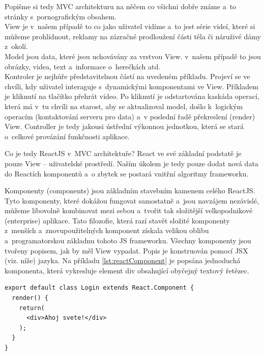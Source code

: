 Popišme si tedy MVC architekturu na něčem co všichni dobře známe a~to stránky s~pornografickým obsahem. \\
View je v~našem případě to co jako uživatel vidíme a~to jest série videí, které si můžeme prohlídnout, reklamy na zázračné prodloužení části těla či náruživé dámy z~okolí. \\
Model jsou data, které jsou uchovávány za vrstvou View. v~našem případě to jsou obrázky, videa, text a~informace o~herečkách atd. \\
Kontroler je nejhůře představitelnou částí na uvedeném příkladu. Projeví se ve chvíli, kdy uživatel interaguje s~dynamickými komponentami ve View. Příkladem je kliknutí na tlačítko přehrát video. Po kliknutí je odstartována kaskáda operací, která má v~tu chvíli na starost, aby se aktualizoval model, došlo k~logickým operacím (kontaktování serveru pro data) a~v poslední řadě překreslení (render) View. Controller je tedy jakousi ústřední výkonnou jednotkou, která se stará o~celkové provázání funkčnosti aplikace.
 
Co je tedy ReactJS v~MVC architektuře? React ve své základní podstatě je pouze View -- uživatelské prostředí. Naším úkolem je tedy pouze dodat nová data do Reactích komponentů a~o zbytek se postará vnitřní algoritmy frameworku. \\


Komponenty (components) jsou základním stavebním kamenem celého ReactJS. Tyto komponenty, které dokážou fungovat samostatně a~jsou navzájem nezávislé, můžeme libovolně kombinovat mezi sebou a~tvořit tak složitější velkopodnikové (enterprise) aplikace. Tato filozofie, která razí stavět složité komponenty z~menších a~znovupoužitelných komponent získala velikou oblibu a~programatorskou základnu tohoto JS frameworku. Všechny komponenty jsou tvořeny popisem, jak by měl View vypadat. Popis je konstruován pomocí JSX (viz. níže) jazyka. Na příkladu \ref{lst:reactComponent} je popsána jednoduchá komponenta, která vykresluje element div obsahující obyčejný textový řetězec. \\

\begin{lstlisting}[numbers=none, caption=Příklad React komponenty, label=lst:reactComponent]
export default class Login extends React.Component {
  render() {
    return(
      <div>Ahoj svete!</div>  
    );
  }
}
\end{lstlisting}

